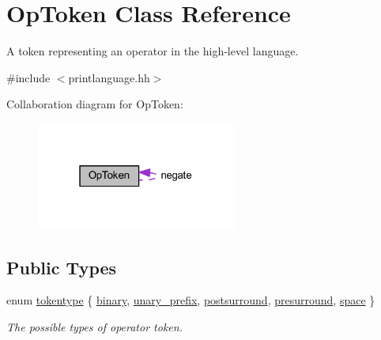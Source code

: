 \hypertarget{class_op_token}{}\section{Op\+Token Class Reference}
\label{class_op_token}


A token representing an operator in the high-\/level language.  




{\ttfamily \#include $<$printlanguage.\+hh$>$}



Collaboration diagram for Op\+Token\+:
\nopagebreak
\begin{figure}[H]
\begin{center}
\leavevmode
\includegraphics[width=187pt]{class_op_token__coll__graph}
\end{center}
\end{figure}
\subsection*{Public Types}
\begin{DoxyCompactItemize}
\item 
enum \mbox{\hyperlink{class_op_token_af41c7f108d5662ede7765c5a6c44eaff}{tokentype}} \{ \newline
\mbox{\hyperlink{class_op_token_af41c7f108d5662ede7765c5a6c44eaffa3a2ec63522a9329a71ddbe8adc3e752d}{binary}}, 
\mbox{\hyperlink{class_op_token_af41c7f108d5662ede7765c5a6c44eaffa0d809c13f66611247b81856fc9e68289}{unary\+\_\+prefix}}, 
\mbox{\hyperlink{class_op_token_af41c7f108d5662ede7765c5a6c44eaffa82a30068870b08542e958e828d6464fa}{postsurround}}, 
\mbox{\hyperlink{class_op_token_af41c7f108d5662ede7765c5a6c44eaffa883dcb2236a61ce30b67ac1da8b817b8}{presurround}}, 
\newline
\mbox{\hyperlink{class_op_token_af41c7f108d5662ede7765c5a6c44eaffa07bc235399849635f28ca7caaaebb1a4}{space}}
 \}
\begin{DoxyCompactList}\small\item\em The possible types of operator token. \end{DoxyCompactList}\end{DoxyCompactItemize}
